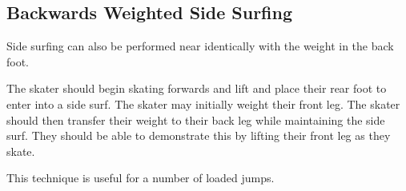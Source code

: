 \subsection*{Backwards Weighted Side Surfing}
\label{drill:side_surf/back_weighted}

Side surfing can also be performed near identically with the weight in the back foot. 

The skater should begin skating forwards and lift and place their rear foot to enter into a side surf.
The skater may initially weight their front leg. 
The skater should then transfer their weight to their back leg while maintaining the side surf.
They should be able to demonstrate this by lifting their front leg as they skate.

This technique is useful for a number of loaded jumps.
